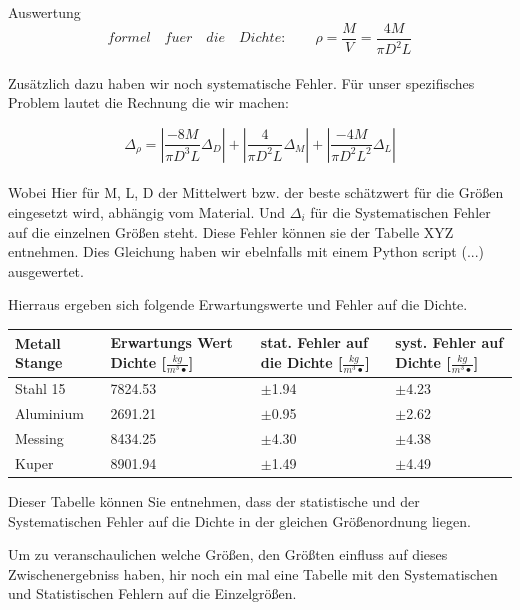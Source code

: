 \documentclass[twoside]{protokoll}
\begin{document}
\begin{aufgabe}{Auswertung}
\begin{equation}
	formel\quad fuer \quad die \quad Dichte: \qquad \rho = \frac{M}{V} = \frac{4M}{\pi D^2L}
\end{equation}\\

Zusätzlich dazu haben wir noch systematische Fehler. Für unser spezifisches Problem lautet die Rechnung die wir machen:

\begin{equation}
	\Delta_{\rho} = \left|\frac{-8M}{\pi D^3L}\Delta_D\right| + 
	\left|\frac{4}{\pi D^2L}\Delta_M\right| + 
	\left|\frac{-4M}{\pi D^2L^2}\Delta_L\right|
\end{equation}\\

Wobei Hier für M, L, D der Mittelwert bzw. der beste schätzwert für die Größen eingesetzt wird, abhängig 
vom Material. Und $\Delta_i$ für die Systematischen Fehler auf die einzelnen Größen steht. 
Diese Fehler können sie der Tabelle XYZ entnehmen. 
Dies Gleichung haben wir ebelnfalls mit einem Python script (...)
ausgewertet.

Hierraus ergeben sich folgende Erwartungswerte und Fehler auf die Dichte. 


 \begin{table}[H]
        \centering
        \begin{tabularx}{1\textwidth}{X X X X} %
            \toprule
            \textbf{Metall Stange} & \textbf{Erwartungs Wert Dichte [$\frac{kg}{m^3•}$]} & \textbf{stat. Fehler auf die Dichte [$\frac{kg}{m^3•}$]} & \textbf{syst. Fehler auf Dichte [$\frac{kg}{m^3•}$]}\\
            \midrule
            Stahl 15 & 7824.53 & $\pm$1.94 & $\pm$4.23 \\
            Aluminium & 2691.21 & $\pm$0.95 & $\pm$2.62 \\
            Messing & 8434.25 & $\pm$4.30 & $\pm$4.38 \\
            Kuper & 8901.94 & $\pm$1.49 & $\pm$4.49\\
            \bottomrule
        \end{tabularx}
        \label{tab:mytable}
    \end{table}

Dieser Tabelle können Sie entnehmen, dass der statistische und der Systematischen Fehler auf die Dichte in der gleichen Größenordnung liegen. 

Um zu veranschaulichen welche Größen, den Größten einfluss auf dieses Zwischenergebniss haben, hir noch ein mal eine Tabelle mit den Systematischen 
und Statistischen Fehlern auf die Einzelgrößen. 


\end{aufgabe}
\end{document}
